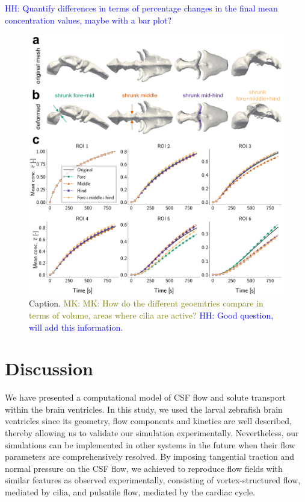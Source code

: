\documentclass[fleqn]{wlscirep}
\newcommand{\lyng}[1]{\textcolor{blue}{#1}}
\newcommand{\mk}[1]{\textcolor{olive}{MK: #1}}
\begin{document}
\lyng{HH: Quantify differences in terms of percentage changes in the final mean concentration values, maybe with a bar plot?}
\begin{figure}[H]
    \centering
    \includegraphics[width=\textwidth]{graphics/figure6_compare_modified_geometries.png}
    \caption{Caption. \mk{MK: How do the different geoemtries compare in terms of volume, areas where cilia are active?} \lyng{HH: Good question, will add this information.}}
    \label{fig:figure6_sim_results_compare_geometries}
\end{figure}


\section*{Discussion}
We have presented a computational model of CSF flow and solute transport within the brain ventricles.
In this study, we used the larval zebrafish brain ventricles since its geometry,
flow components and kinetics are well described, thereby allowing us to validate
our simulation experimentally. Nevertheless, our simulations can be implemented in
other systems in the future when their flow parameters are comprehensively resolved.  
By imposing tangential traction and normal pressure on the CSF flow, we achieved to reproduce
flow fields with similar features as observed experimentally, consisting of vortex-structured flow,
mediated by cilia, and pulsatile flow, mediated by the cardiac cycle.
\end{document}
